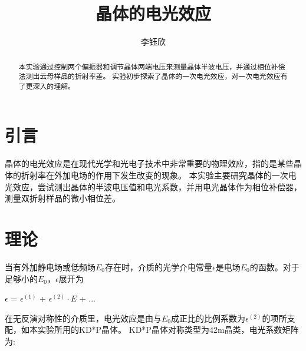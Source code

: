 \documentclass[font=default]{mpltx}
\makeatletter
\newcommand\releasedate{%
    \href{https://github.com/CastleStar14654/PKUMpLtX/releases/tag/\mpltx@fileversion}%
        {\mpltx@filedate, \mpltx@fileversion}}
\makeatother
\begin{document}
\title{晶体的电光效应} %
\author{李钰欣} %
\date{}
\begin{abstract}
  本实验通过控制两个偏振器和调节晶体两端电压来测量晶体半波电压，并通过相位补偿法测出云母样品的折射率差。
  实验初步探索了晶体的一次电光效应，对一次电光效应有了更深入的理解。
\end{abstract}

\maketitle

\section{引言}

晶体的电光效应是在现代光学和光电子技术中非常重要的物理效应，指的是某些晶体的折射率在外加电场的作用下发生改变的现象。
本实验主要研究晶体的一次电光效应，尝试测出晶体的半波电压值和电光系数，并用电光晶体作为相位补偿器，测量双折射样品的微小相位差。

 
\section{理论}\label{sec:theory}
当有外加静电场或低频场$E_0$存在时，介质的光学介电常量$\epsilon$是电场$E_0$的函数。对于足够小的$E_0$，$\epsilon$展开为

$\epsilon$ = $\epsilon^{(1)}$ + $\epsilon^{(2)}\cdot E$ + ...

在无反演对称性的介质里，电光效应是由与$E_0$成正比的比例系数为$\epsilon^{(2)}$的项所支配，如本实验所用的KD*P晶体。
KD*P晶体对称类型为$\overline{4}$2m晶类，电光系数矩阵为:
\end{document}
